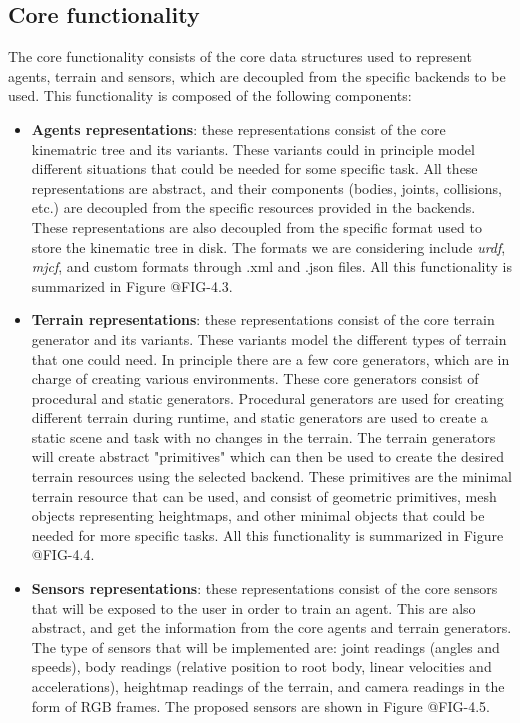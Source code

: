 \subsection{Core functionality}

The core functionality consists of the core data structures used to represent agents,
terrain and sensors, which are decoupled from the specific backends to be used. This functionality
is composed of the following components:

\begin{itemize}
    \item \textbf{Agents representations}: these representations consist of the core kinematric tree and its
          variants. These variants could in principle model different situations that could be needed
          for some specific task. All these representations are abstract, and their components (bodies, 
          joints, collisions, etc.) are decoupled from the specific resources provided in the backends.
          These representations are also decoupled from the specific format used to store the kinematic
          tree in disk. The formats we are considering include \textit{urdf}, \textit{mjcf}, and custom
          formats through .xml and .json files. All this functionality is summarized in Figure @FIG-4.3.

    \item \textbf{Terrain representations}: these representations consist of the core terrain generator and its
          variants. These variants model the different types of terrain that one could need. In principle
          there are a few core generators, which are in charge of creating various environments. These core
          generators consist of procedural and static generators. Procedural generators are used for creating
          different terrain during runtime, and static generators are used to create a static scene and task
          with no changes in the terrain. The terrain generators will create abstract "primitives" which can then
          be used to create the desired terrain resources using the selected backend. These primitives are the minimal
          terrain resource that can be used, and consist of geometric primitives, mesh objects representing heightmaps,
          and other minimal objects that could be needed for more specific tasks. All this functionality is
          summarized in Figure @FIG-4.4.

    \item \textbf{Sensors representations}: these representations consist of the core sensors that will be exposed
          to the user in order to train an agent. This are also abstract, and get the information from the
          core agents and terrain generators. The type of sensors that will be implemented are: joint readings (angles 
          and speeds), body readings (relative position to root body, linear velocities and accelerations), 
          heightmap readings of the terrain, and camera readings in the form of RGB frames. The proposed sensors are shown
          in Figure @FIG-4.5.
\end{itemize}

